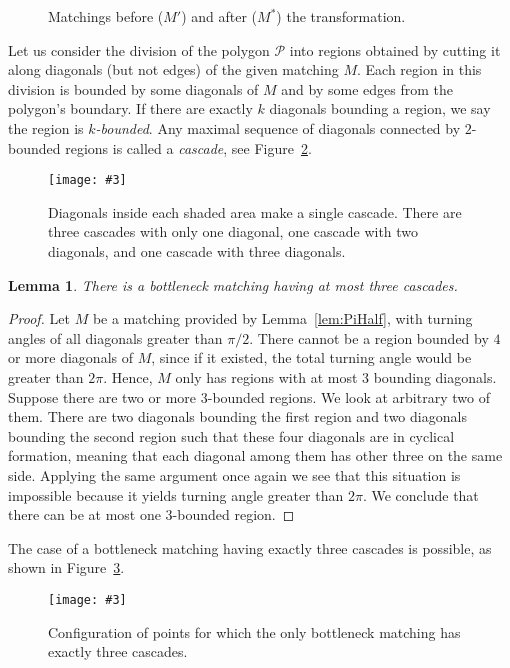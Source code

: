 \documentclass[a4paper, 11pt]{article}
\newtheorem{lemma}[theorem]{Lemma}
\newcommand{\fig}[3]{
	\begin{figure}[ht]
		\centering
		\texttt{[image: \#3]}
		\caption{#2}
		\label{#1}
	\end{figure}
}
\begin{document}
	\begin{figure}[ht]
		\centering
		\hspace{20pt}
		\caption{Matchings before ($M'$) and after ($M^*$) the transformation.}
		\label{fig:PiHalf}				
	\end{figure}

Let us consider the division of the polygon $\mathcal{P}$ into regions obtained by cutting it along diagonals (but not edges) of the given matching $M$. Each region in this division is bounded by some diagonals of $M$ and by some edges from the polygon's boundary. If there are exactly $k$ diagonals bounding a region, we say the region is \emph{$k$-bounded}. Any maximal sequence of diagonals connected by $2$-bounded regions is called a \emph{cascade}, see Figure~\ref{fig:Cascades}.

\fig{fig:Cascades}{Diagonals inside each shaded area make a single cascade. There are three cascades with only one diagonal, one cascade with two diagonals, and one cascade with three diagonals.}{Cascades.pdf}


\begin{lemma}
	\label{lem:ThreeCascades}
	There is a bottleneck matching having at most three cascades.
\end{lemma}
\begin{proof}
	Let $M$ be a matching provided by Lemma~\ref{lem:PiHalf}, with turning angles of all diagonals greater than $\pi/2$. There cannot be a region bounded by $4$ or more diagonals of $M$, since if it existed, the total turning angle would be greater than $2\pi$. Hence, $M$ only has regions with at most $3$ bounding diagonals. Suppose there are two or more $3$-bounded regions. We look at arbitrary two of them. There are two diagonals bounding the first region and two diagonals bounding the second region such that these four diagonals are in cyclical formation, meaning that each diagonal among them has other three on the same side. Applying the same argument once again we see that this situation is impossible because it yields turning angle greater than $2\pi$. We conclude that there can be at most one $3$-bounded region. 
\end{proof}

The case of a bottleneck matching having exactly three cascades is possible, as shown in Figure~\ref{fig:ThreeCascadesExample}.

\fig{fig:ThreeCascadesExample}{Configuration of points for which the only bottleneck matching has exactly three cascades.}{ThreeCascadesExample.pdf}
\end{document}

